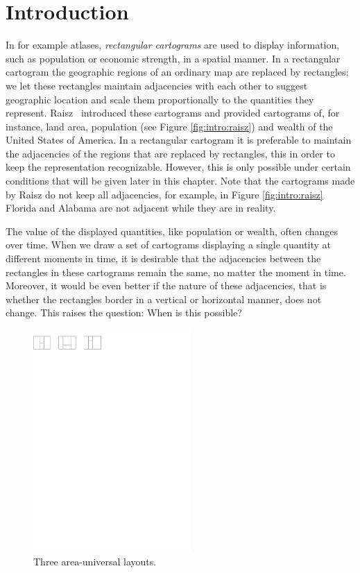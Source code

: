 
\section{Introduction}
\thispagestyle{plain}


  In for example atlases, \emph{rectangular cartograms} are used to display information, such as population or economic strength, in a spatial manner.
  In a rectangular cartogram  the geographic regions of an ordinary map are replaced by rectangles; we let these rectangles maintain adjacencies with each other to suggest geographic location and scale them proportionally to the quantities they represent.
  Raisz~\cite{Raisz1934} introduced these cartograms and provided cartograms of, for instance, land area, population (see Figure  \ref{fig:intro:raisz}) and wealth of the United States of America.
  In a rectangular cartogram it is preferable to maintain the adjacencies of the regions that are replaced by rectangles, this in order to keep the representation recognizable.
  However, this is only possible under certain conditions that will be given later in this chapter.
  Note that the cartograms made by Raisz do not keep all adjacencies, for example, in Figure \ref{fig:intro:raisz} Florida and Alabama are not adjacent while they are in reality.

  The value of the displayed quantities, like population or wealth, often changes over time.
  When we draw a set of cartograms displaying a single quantity at different moments in time, it is desirable that the adjacencies between the rectangles in these cartograms remain the same, no matter the moment in time.
  Moreover, it would be even better if the nature of these adjacencies, that is whether the rectangles border in a vertical or horizontal manner, does not change.
  This raises the question: When is this possible?

  \begin{figure} %
    \centering
    \includegraphics[width = 6cm]{introduction/img/areaunivLayout.pdf}
    \caption{Three area-universal layouts.}
    \label{fig:intro:areaunivLayout}
  \end{figure}

